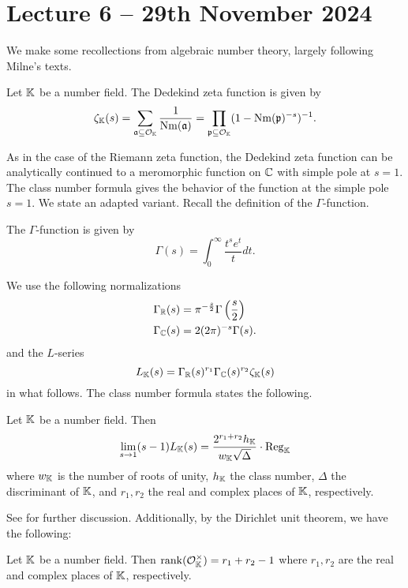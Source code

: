 \section{Lecture 6 -- 29th November 2024}\label{sec: lecture 6}
We make some recollections from algebraic number theory, largely following Milne's texts. 
\begin{definition}\label{def: Dedekind zeta}
    Let $\mathbb{K}$ be a number field. The Dedekind zeta function is given by 
    $$\zeta_{\mathbb{K}}(s)=\sum_{\mathfrak{a}\subseteq\mathcal{O}_{\mathbb{K}}}\frac{1}{\mathrm{Nm}(\mathfrak{a})}=\prod_{\mathfrak{p}\subseteq\mathcal{O}_{\mathbb{K}}}(1-\mathrm{Nm}(\mathfrak{p})^{-s})^{-1}.$$
\end{definition}
As in the case of the Riemann zeta function, the Dedekind zeta function can be analytically continued to a meromorphic function on $\mathbb{C}$ with simple pole at $s=1$. The class number formula gives the behavior of the function at the simple pole $s=1$. We state an adapted variant. Recall the definition of the $\Gamma$-function. 
\begin{definition}\label{def: gamma function}
    The $\Gamma$-function is given by 
    $$\Gamma(s)=\int_{0}^{\infty}\frac{t^{s}e^{t}}{t}dt.$$
\end{definition}
We use the following normalizations 
\begin{align*}
    \Gamma_{\mathbb{R}}(s) &= \pi^{-\frac{s}{2}}\Gamma\left(\frac{s}{2}\right) \\
    \Gamma_{\mathbb{C}}(s) &= 2(2\pi)^{-s}\Gamma(s).
\end{align*}
and the $L$-series 
\begin{equation}\label{eqn: L-series}
    L_{\mathbb{K}}(s)=\Gamma_{\mathbb{R}}(s)^{r_{1}}\Gamma_{\mathbb{C}}(s)^{r_{2}}\zeta_{\mathbb{K}}(s)
\end{equation}
in what follows. The class number formula states the following. 
\begin{theorem}\label{thm: class number formula}
    Let $\mathbb{K}$ be a number field. Then 
    $$\lim_{s\to 1}(s-1)L_{\mathbb{K}}(s)=\frac{2^{r_{1}+r_{2}}h_{\mathbb{K}}}{w_{\mathbb{K}}\sqrt{\Delta}}\cdot\mathrm{Reg}_{\mathbb{K}}$$
    where $w_{\mathbb{K}}$ is the number of roots of unity, $h_{\mathbb{K}}$ the class number, $\Delta$ the discriminant of $\mathbb{K}$, and $r_{1},r_{2}$ the real and complex places of $\mathbb{K}$, respectively.  
\end{theorem}
See \cite[\S V.2]{milneCFT} for further discussion. Additionally, by the Dirichlet unit theorem, we have the following:
\begin{theorem}\label{thm: Dirichlet unit}
    Let $\mathbb{K}$ be a number field. Then $\mathrm{rank}(\mathcal{O}_{\mathbb{K}}^{\times})=r_{1}+r_{2}-1$ where $r_{1},r_{2}$ are the real and complex places of $\mathbb{K}$, respectively. 
\end{theorem}
